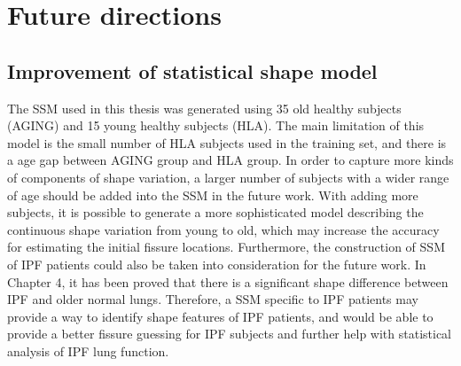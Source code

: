 \section{Future directions}\label{FutureDirection}
\subsection{Improvement of statistical shape model}
The SSM used in this thesis was generated using 35 old healthy subjects (AGING) and 15 young healthy subjects (HLA). The main limitation of this model is the small number of HLA subjects used in the training set, and there is a age gap between AGING group and HLA group. In order to capture more kinds of components of shape variation, a larger number of subjects with a wider range of age should be added into the SSM in the future work. With adding more subjects, it is possible to generate a more sophisticated model describing the continuous shape variation from young to old, which may increase the accuracy for estimating the initial fissure locations. Furthermore, the construction of SSM of IPF patients could also be taken into consideration for the future work. In Chapter 4, it has been proved that there is a significant shape difference between IPF and older normal lungs. Therefore, a SSM specific to IPF patients may provide a way to identify shape features of IPF patients, and would be able to provide a better fissure guessing for IPF subjects and further help with statistical analysis of IPF lung function. 

